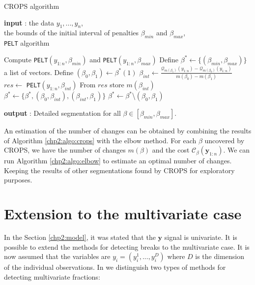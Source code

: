 \begin{algorithm}[ht]
\caption{CROPS algorithm}\label{chp2:algo:crops}
\begin{algorithmic}

\State \textbf{input} : the data $y_{1},...,y_{n}$, \\
the bounds of the initial interval of penalties $\beta_{min}$ and $\beta_{max}$, \\
\texttt{PELT} algorithm 
  
\State Compute \texttt{PELT}$(y_{1:n},\beta_{min})$ and \texttt{PELT}$(y_{1:n},\beta_{max})$ 
\State Define $\beta^* \gets \{(\beta_{min},\beta_{max})\}$ a list of vectors.  
\While{$\beta^*\neq \emptyset$}
  \State Define $(\beta_0, \beta_1) \gets \beta^*(1)$
    \State $\beta_{int} \gets \frac{\mathcal{Q}_{m(\beta_1)}(y_{1:n})-\mathcal{Q}_{m(\beta_0)}(y_{1:n})}{m(\beta_0)-m(\beta_1)}$
    \State $res \gets$ \texttt{PELT}$(y_{1:n},\beta_{int})$
    \State From $res$ store $m(\beta_{int})$
      \State $\beta^* \gets \{\beta^*,(\beta_0,\beta_{int}),(\beta_{int},\beta_1)\}$
    \EndIf
  \EndIf
  \State $\beta^* \gets \beta^*$\textbackslash$(\beta_0,\beta_1)$
\EndWhile 
   
\State \textbf{output} : Detailed segmentation for all $\beta \in [\beta_{min},\beta_{max}]$. 
\end{algorithmic}
\end{algorithm} 

An estimation of the number of changes can be obtained by combining the results of Algorithm  \ref{chp2:algo:crops} with the elbow method. For each $\beta$ uncovered by CROPS, we have the number of changes $m(\beta)$ and the cost $\mathcal{C}_{\beta}(\bm y_{1:n})$. We can run Algorithm \ref{chp2:algo:elbow} to estimate an optimal number of changes. Keeping the results of other segmentations found by CROPS for exploratory purposes. 

\section{Extension to the multivariate case}

In the Section \ref{chp2:model}, it was stated that the $\bm y$ signal is univariate. It is possible to extend the methods for detecting breaks to the multivariate case. It is now assumed that the variables are $y_i = (y_i^1,...,y_i^D)$ where $D$ is the dimension of the individual observations. In \cite{pickering2016changepoint} we distinguish two types of methods for detecting multivariate fractions:


